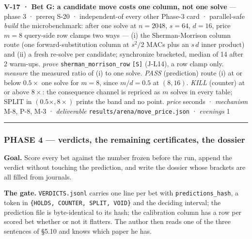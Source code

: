 \documentclass[11pt,a4paper]{article}
\theoremstyle{plain}
\theoremstyle{definition}
\theoremstyle{remark}
\begin{document}
\textbf{V-17 · Bet G: a candidate move costs one column, not one solve}
--- phase 3 · prereq S-20 · independent-of every other Phase-3 card ·
parallel-safe \emph{build} the microbenchmark: after one solve at
\(n=2048\), \(s=64\), \(d=16\), price \(m=8\) query-side row clamps two
ways --- (i) the Sherman-Morrison column route (one forward-substitution
column at \(s^2/2\) MACs plus an \(s\,d\) inner product) and (ii) a
fresh re-solve per candidate; synchronize bracketed, median of 14 after
2 warm-ups. \emph{prove} \texttt{sherman\_morrison\_row}
\texttt{{[}S{]}} (J-L14), a row clamp only. \emph{measure} the measured
ratio of (i) to one solve. \emph{PASS} (prediction) route (i) at or
below \(0.5\times\) one solve for \(m=8\), since \(m/d=0.5\) at
\((8,16)\). \emph{KILL} (counter) at or above \(8\times\): the
consequence channel is repriced as \(m\) solves in every table; SPLIT in
\((0.5\times, 8\times)\) prints the band and no point. \emph{price}
seconds · \emph{mechanism} M-8, P-8, M-3 · \emph{deliverable}
\texttt{results/arena/move\_price.json} · \emph{evenings} 1

\begin{center}\rule{0.5\linewidth}{0.5pt}\end{center}

\subsubsection{PHASE 4 --- verdicts, the remaining certificates, the
dossier}\label{phase-4-verdicts-the-remaining-certificates-the-dossier}

\textbf{Goal.} Score every bet against the number frozen before the run,
append the verdict without touching the prediction, and write the
dossier whose brackets are all filled from journals.

\textbf{The gate.} \texttt{VERDICTS.jsonl} carries one line per bet with
\texttt{predictions\_hash}, a token in
\texttt{\{HOLDS,\ COUNTER,\ SPLIT,\ VOID\}} and the deciding interval;
the prediction file is byte-identical to its hash; the calibration
column has a row per scored bet whether or not it flatters. The author
then reads one of the three sentences of §5.10 and knows which paper he
has.
\end{document}
